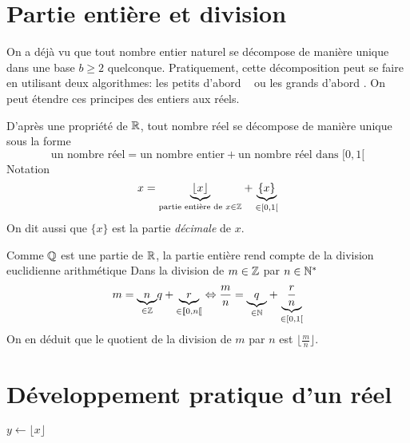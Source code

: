 



\section{Partie entière et division}
On a déjà vu que tout nombre entier naturel se décompose de manière unique dans une base $b\geq2$ quelconque. Pratiquement, cette décomposition peut se faire en utilisant deux algorithmes: \og les petits d'abord \fg~ ou \og les grands d'abord \fg. On peut étendre ces principes des entiers aux réels.

D'après une propriété de $\mathbb{R}$, tout nombre réel se décompose de manière unique sous la forme
\begin{displaymath}
  \text{un nombre réel} = \text{un nombre entier} + \text{un nombre réel dans $[0,1[$}
\end{displaymath}
Notation
\begin{displaymath}
  x = \underset{\text{partie entière de } x\in \mathbb{Z} }{\underbrace{\lfloor x \rfloor}} + \underset{\in [0,1[ }{\underbrace{\{ x \}}}
\end{displaymath}
On dit aussi que $\{x\}$ est la partie \emph{décimale} de $x$.

Comme $\mathbb{Q}$ est une partie de $\mathbb{R}$, la partie entière rend compte de la division euclidienne arithmétique\newline
Dans la division de $m\in \mathbb{Z}$ par $n\in \mathbb{N}^*$ 
\begin{displaymath}
  m = \underset{\in \mathbb{Z}}{\underbrace{n}}q + \underset{\in \llbracket 0, n\llbracket}{\underbrace{r}}
  \Leftrightarrow \frac{m}{n} = \underset{\in \mathbb{N}}{\underbrace{q}} + \underset{\in [0,1[}{\underbrace{\frac{r}{n}}} 
\end{displaymath}
On en déduit que le quotient de la division de $m$ par $n$ est $\lfloor \frac{m}{n} \rfloor$.
\section{Développement pratique d'un réel}
\begin{algorithm}
  $y\longleftarrow \lfloor x \rfloor$\;
  \caption{\`A gauche: les petits d'abord.}
  \label{nbbin_1}
\end{algorithm}

